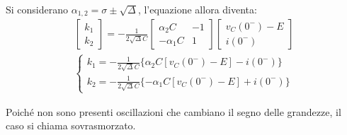 \documentclass{article}
\numberwithin{equation}{subsection}
\begin{document}
Si considerano $\alpha_{1,2}=\sigma\pm\sqrt\Delta$, l'equazione allora diventa:
\begin{gather*}
    \begin{bmatrix}
        k_1\\k_2
    \end{bmatrix}=\displaystyle-\frac{1}{2\sqrt{\Delta} C}\begin{bmatrix}
        \alpha_2C&-1\\-\alpha_1C&1
    \end{bmatrix}\begin{bmatrix}
        v_C(0^-)-E\\i(0^-)
    \end{bmatrix}\\
    \begin{cases}
        k_1=\displaystyle-\frac{1}{2\sqrt{\Delta} C}\{\alpha_2C[v_C(0^-)-E]-i(0^-)\}\\
        k_2=\displaystyle-\frac{1}{2\sqrt{\Delta} C}\{-\alpha_1C[v_C(0^-)-E]+i(0^-)\}
    \end{cases}
\end{gather*}
 

Poiché non sono presenti oscillazioni che cambiano il segno delle grandezze, il caso si chiama sovrasmorzato. 
\end{document}

